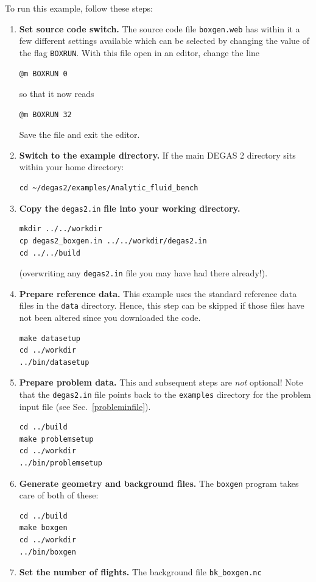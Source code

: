 \documentclass[12pt]{report}
\begin{document}
To run this example, follow these steps:
\begin{enumerate}
  \item {\bf Set source code switch.} The source code file {\tt boxgen.web}
has within it a few different settings available which can be selected
by changing the value of the flag {\tt BOXRUN}. With this file open in
an editor, change the line
\begin{verbatim}
@m BOXRUN 0
\end{verbatim}
so that it now reads
\begin{verbatim}
@m BOXRUN 32
\end{verbatim}
Save the file and exit the editor. 
  \item {\bf Switch to the example directory.} If the main DEGAS 2 
directory sits within your home directory:
\begin{verbatim}
cd ~/degas2/examples/Analytic_fluid_bench
\end{verbatim}
  \item {\bf Copy the} {\tt degas2.in} {\bf file into your working
directory.}
\begin{verbatim}
mkdir ../../workdir
cp degas2_boxgen.in ../../workdir/degas2.in
cd ../../build
\end{verbatim}
(overwriting any {\tt degas2.in} file you may have had there already!).
  \item {\bf Prepare reference data.} This example uses the standard
reference data files in the {\tt data} directory. Hence, this step can
be skipped if
those files have not been altered since you downloaded the code.
\begin{verbatim}
make datasetup
cd ../workdir
../bin/datasetup
\end{verbatim}
  \item {\bf Prepare problem data.} This and subsequent steps are 
{\em not} optional! Note that the {\tt degas2.in} file points back to
the {\tt examples} directory for the problem input file (see
Sec.~\ref{probleminfile}).
\begin{verbatim}
cd ../build
make problemsetup
cd ../workdir
../bin/problemsetup
\end{verbatim}
  \item {\bf Generate geometry and background files.} The {\tt boxgen}
program takes care of both of these:
\begin{verbatim}
cd ../build
make boxgen
cd ../workdir
../bin/boxgen
\end{verbatim}
  \item {\bf Set the number of flights.} The background file {\tt bk\_boxgen.nc}

\end{enumerate}
\end{document}
